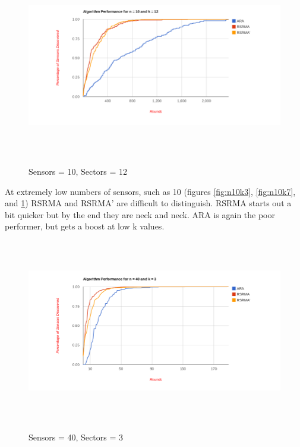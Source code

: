 \begin{figure}[ht]
\caption{Sensors = 10, Sectors = 12}
\includegraphics[height = 8cm]{pics/graph10k12.png}\\[0.5cm] 
\label{fig:n10k12}   
\end{figure}

At extremely low numbers of sensors, such as 10 (figures \ref{fig:n10k3}, \ref{fig:n10k7}, and \ref{fig:n10k12}) RSRMA and RSRMA' are difficult to distinguish. RSRMA starts out a bit quicker but by the end they are neck and neck. ARA is again the poor performer, but gets a boost at low k values.

\begin{figure}[ht]
\caption{Sensors = 40, Sectors = 3}
\includegraphics[height = 8cm]{pics/graph40k3.png}\\[0.5cm]    
\label{fig:n40k3}
\end{figure}

